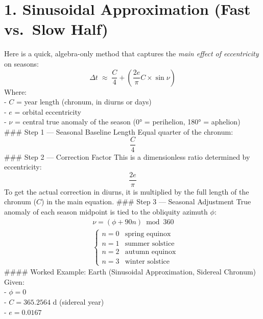 \documentclass[
  letterpaper,
]{book}
\begin{document}
\section{1. Sinusoidal Approximation (Fast vs.~Slow
Half)}\label{sinusoidal-approximation-fast-vs.-slow-half}

Here is a quick, algebra-only method that captures the \emph{main effect
of eccentricity} on seasons: \[
\Delta t \;\approx\; \dfrac{C}{4} + \left(\dfrac{2e}{\pi} C \times \sin \nu\right)
\] Where:\\
- \(C\) = year length (chronum, in diurns or days)\\
- \(e\) = orbital eccentricity\\
- \(\nu\) = central true anomaly of the season (0° = perihelion, 180° =
aphelion)\\
\#\#\# Step 1 --- Seasonal Baseline Length Equal quarter of the chronum:
\[
\dfrac{C}{4}
\] \#\#\# Step 2 --- Correction Factor This is a dimensionless ratio
determined by eccentricity: \[
\dfrac{2e}{\pi}
\] To get the actual correction in diurns, it is multiplied by the full
length of the chronum (\(C\)) in the main equation. \#\#\# Step 3 ---
Seasonal Adjustment True anomaly of each season midpoint is tied to the
obliquity azimuth \(\phi\): \[
\begin{align}
&\nu = (\phi + 90n) \bmod 360 \\[1em]
&\begin{cases}
n = 0 &\text{spring equinox} \\
n = 1 &\text{summer solstice} \\
n = 2 &\text{autumn equinox} \\
n = 3 &\text{winter solstice}
\end{cases}
\end{align}
\] \#\#\#\# Worked Example: Earth (Sinusoidal Approximation, Sidereal
Chronum) Given:\\
- \(\phi = 0\)\\
- \(C = 365.2564\) d (sidereal year)\\
- \(e = 0.0167\)
\end{document}
